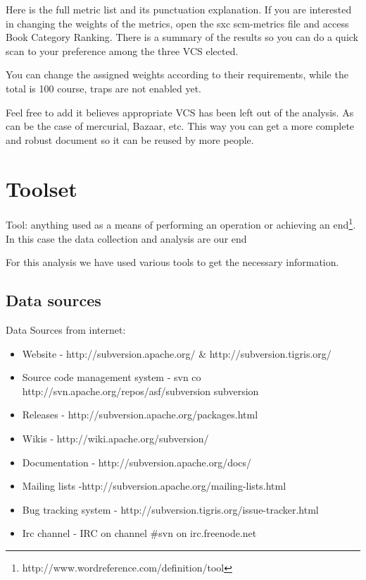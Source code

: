 \documentclass[11pt]{scrartcl}
\begin{document}
\par Here is the full metric list and its punctuation explanation. If you are interested in changing the weights of the metrics, open the sxc scm-metrics file and access Book Category Ranking. There is a summary of the results so you can do a quick scan to your preference among the three VCS elected.

\par You can change the assigned weights according to their requirements, while the total is 100 course, traps are not enabled yet.

\par Feel free to add it believes appropriate VCS has been left out of the analysis. As can be the case of mercurial, Bazaar, etc. This way you can get a more complete and robust document so it can be reused by more people.

\section{Toolset}

\par Tool: anything used as a means of performing an operation or achieving an end\footnote{http://www.wordreference.com/definition/tool}. In this case the data collection and analysis are our end

\par For this analysis we have used various tools to get the necessary information.

\subsection{Data sources}

Data Sources from internet:

\begin{itemize}
    \item Website - http://subversion.apache.org/ \& http://subversion.tigris.org/
    \item Source code management system - svn co http://svn.apache.org/repos/asf/subversion subversion
    \item Releases - http://subversion.apache.org/packages.html
    \item Wikis - http://wiki.apache.org/subversion/
    \item Documentation - http://subversion.apache.org/docs/
    \item Mailing lists -http://subversion.apache.org/mailing-lists.html
    \item Bug tracking system - http://subversion.tigris.org/issue-tracker.html
    \item Irc channel - IRC on channel \#svn on irc.freenode.net
\end{itemize}
\end{document}
